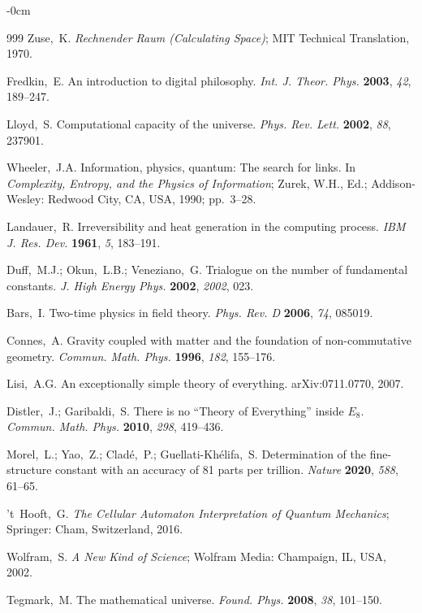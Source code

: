 \documentclass[entropy,article,submit,pdftex,oneauthor]{Definitions/mdpi}
\begin{document}
\begin{adjustwidth}{-\extralength}{0cm}
\begin{thebibliography}{999}
Zuse,~K. \textit{Rechnender Raum (Calculating Space)}; MIT Technical Translation, 1970.

Fredkin,~E. An introduction to digital philosophy. \textit{Int. J. Theor. Phys.} \textbf{2003}, \textit{42}, 189--247.

Lloyd,~S. Computational capacity of the universe. \textit{Phys. Rev. Lett.} \textbf{2002}, \textit{88}, 237901.

Wheeler,~J.A. Information, physics, quantum: The search for links. In \textit{Complexity, Entropy, and the Physics of Information}; Zurek, W.H., Ed.; Addison-Wesley: Redwood City, CA, USA, 1990; pp.~3--28.

Landauer,~R. Irreversibility and heat generation in the computing process. \textit{IBM J. Res. Dev.} \textbf{1961}, \textit{5}, 183--191.

Duff,~M.J.; Okun,~L.B.; Veneziano,~G. Trialogue on the number of fundamental constants. \textit{J. High Energy Phys.} \textbf{2002}, \textit{2002}, 023.

Bars,~I. Two-time physics in field theory. \textit{Phys. Rev. D} \textbf{2006}, \textit{74}, 085019.

Connes,~A. Gravity coupled with matter and the foundation of non-commutative geometry. \textit{Commun. Math. Phys.} \textbf{1996}, \textit{182}, 155--176.

Lisi,~A.G. An exceptionally simple theory of everything. arXiv:0711.0770, 2007.

Distler,~J.; Garibaldi,~S. There is no ``Theory of Everything'' inside $E_8$. \textit{Commun. Math. Phys.} \textbf{2010}, \textit{298}, 419--436.

Morel,~L.; Yao,~Z.; Clad\'{e},~P.; Guellati-Kh\'{e}lifa,~S. Determination of the fine-structure constant with an accuracy of 81 parts per trillion. \textit{Nature} \textbf{2020}, \textit{588}, 61--65.

't~Hooft,~G. \textit{The Cellular Automaton Interpretation of Quantum Mechanics}; Springer: Cham, Switzerland, 2016.

Wolfram,~S. \textit{A New Kind of Science}; Wolfram Media: Champaign, IL, USA, 2002.

Tegmark,~M. The mathematical universe. \textit{Found. Phys.} \textbf{2008}, \textit{38}, 101--150.


\end{thebibliography}
\end{adjustwidth}
\end{document}
